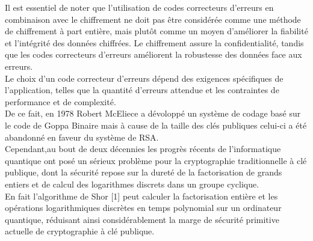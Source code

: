 \documentclass[12pt,openany]{report}
\begin{document}
Il est essentiel de noter que l'utilisation de codes correcteurs d'erreurs en combinaison avec le chiffrement ne doit pas être considérée comme une méthode de chiffrement à part entière,\hspace{0.2cm} mais plutôt comme un moyen d'améliorer la fiabilité et l'intégrité des données chiffrées.\hspace{0.2cm} Le chiffrement assure la confidentialité,\hspace{0.2cm} tandis que les codes correcteurs d'erreurs améliorent la robustesse des données face aux erreurs.\\
 Le choix d'un code correcteur d'erreurs dépend des exigences spécifiques de l'application,\hspace{0.2cm} telles que la quantité d'erreurs attendue et les contraintes de performance et de complexité.\\De ce fait,\hspace{0.2cm} en 1978 Robert  McEliece a dévoloppé un système de codage basé sur le code de Goppa Binaire mais à cause de la taille des clés publiques celui-ci a été abandonné en faveur du système de RSA.\\ 
 Cependant,\hspace{0.2cm}au bout de deux décennies les progrès récents de l’informatique quantique ont  posé un sérieux problème pour la cryptographie traditionnelle à clé publique,\hspace{0.2cm} dont la sécurité repose sur la dureté de la factorisation de grands entiers et de calcul des logarithmes discrets dans un groupe cyclique.\\
 En fait
l’algorithme de Shor [1] peut calculer la factorisation entière
et les opérations logarithmiques discrètes en temps polynomial sur un ordinateur quantique,\hspace{0.2cm} réduisant ainsi considérablement la marge de sécurité
  primitive actuelle de cryptographie à clé publique.\hspace{0.2cm}
\end{document}

